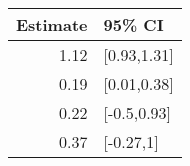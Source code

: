 \begin{tabular}{rl}
  \hline
Estimate & 95\% CI \\ 
  \hline
1.12 & [0.93,1.31] \\ 
  0.19 & [0.01,0.38] \\ 
  0.22 & [-0.5,0.93] \\ 
  0.37 & [-0.27,1] \\ 
   \hline
\end{tabular}

